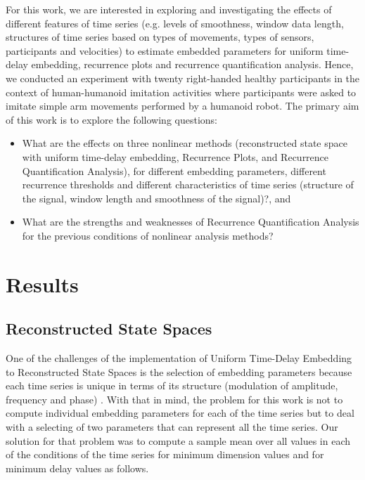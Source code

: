 \documentclass[fleqn,10pt]{wlscirep}
\begin{document}
For this work, we are interested in exploring and investigating  
the effects of different features of time series 
(e.g. levels of smoothness, window data length,
structures of time series based on types of movements, 
types of sensors, participants and velocities) to estimate 
embedded parameters for uniform time-delay embedding, 
recurrence plots and recurrence quantification analysis.
Hence, we conducted an experiment with twenty right-handed 
healthy participants in the context of human-humanoid imitation 
activities where participants were asked to 
imitate simple arm movements performed by a humanoid robot.
The primary aim of this work is to explore the following questions:
\begin{itemize}
\item What are the effects on three nonlinear methods 
	(reconstructed state space with uniform time-delay embedding, 
	Recurrence Plots, and Recurrence Quantification Analysis), 
	for different embedding parameters, different recurrence thresholds 
	and different characteristics of time series 
	(structure of the signal, window length and smoothness of the signal)?, and 
\item What are the strengths and weaknesses of Recurrence
	Quantification Analysis for the previous conditions
	of nonlinear analysis methods?
\end{itemize}


\section*{Results}

\subsection*{Reconstructed State Spaces}
One of the challenges of the implementation of 
Uniform Time-Delay Embedding to Reconstructed State Spaces is the 
selection of embedding parameters because each time series is unique in 
terms of its structure (modulation of amplitude, frequency and phase) 
\cite{ frank2010, sama2013, bradley2015}.
With that in mind, the problem for this work is not to compute individual 
embedding parameters for each of the time series but to deal with a 
selecting of two parameters that can represent all the time series. 
Our solution for that problem was to compute a sample mean over all 
values in each of the conditions of the time series 
for minimum dimension values and 
for minimum delay values as follows.
\end{document}
